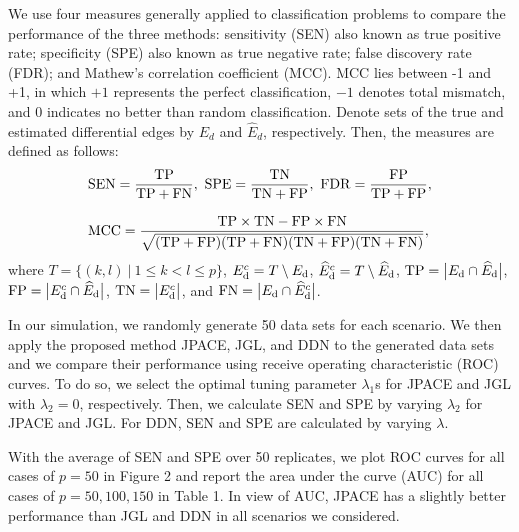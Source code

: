 \documentclass[useAMS,usenatbib,referee]{bio}
\begin{document}
{We use four measures generally applied to classification problems to compare the performance of the three methods: sensitivity (SEN) also known as true positive rate;  specificity (SPE) also known as true negative rate; false discovery rate (FDR); and Mathew's correlation coefficient (MCC). MCC lies between -1 and +1, in which $+1$ represents the perfect classification, $-1$ denotes total mismatch, and $0$ indicates no better than random classification.
Denote sets of the true and estimated differential edges by ${E}_d$ and $\widehat{E}_d$, respectively. Then, the measures are defined as follows:
\begin{equation} \nonumber 
\begin{array}{l} \medskip
{\rm SEN}=\displaystyle \frac{{\rm TP} }{{\rm TP}+{\rm FN} },~ 
{\rm SPE}=\displaystyle \frac{{\rm TN} }{{\rm TN}+{\rm FP} },~
{\rm FDR} = \displaystyle  \frac{{\rm FP}}{\rm TP + FP} ,\medskip \\ 
{\rm MCC} = \displaystyle
 \frac{{\rm TP} \times {\rm TN} - {\rm FP} \times {\rm FN}}{\sqrt{({\rm TP}+{\rm FP})({\rm TP}+{\rm FN})({\rm TN}+{\rm FP})({\rm TN}+{\rm FN})}},
  \end{array}
\end{equation}
where $T = \{ (k,l) ~|~ 1\le k<l \le p\}$, 
$E_{\rm d}^c = T \setminus E_{\rm d}$, 
$\widehat{E}_{\rm d}^c = T \setminus \widehat{E}_{\rm d}$,
${\rm TP} = \big|{E}_{\rm d}  \cap \widehat{E}_{\rm d} \big|$,
${\rm FP} = \big| E_{\rm d}^c \cap \widehat{E}_{\rm d} \big|$,
${\rm TN} = \big| E_{\rm d}^c  \big|$, and
${\rm FN} = \big| E_{\rm d}  \cap \widehat{E}_{\rm d}^c \big|$.


In our simulation, we randomly generate 50 data sets for each scenario. We then apply the proposed method JPACE, JGL, and DDN to the generated data sets and we compare their performance using receive operating characteristic (ROC) curves. To do so, we select the optimal tuning parameter $\lambda_1$s for JPACE and JGL with $\lambda_2 = 0$, respectively.
Then, we calculate SEN and SPE by varying $\lambda_2$ for JPACE and JGL. For DDN, SEN and SPE are calculated by varying $\lambda$.

With the average of SEN and SPE over 50 replicates, we plot ROC curves for all cases of $p=50$ in Figure 2 and report the area under the curve (AUC) for all cases of $p=50,100,150$ in Table 1.
In view of AUC, JPACE has a slightly better performance than JGL and DDN in all scenarios we considered.


}
\end{document}
